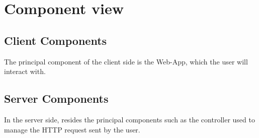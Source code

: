 \newpage

\section{Component view}

\subsection{Client Components}
The principal component of the client side is the Web-App, which the user will interact with.

\subsection{Server Components}

In the server side, resides the principal components such as the controller used to manage the HTTP request sent by the user.

